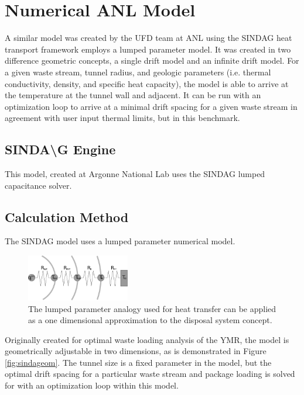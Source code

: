 \documentclass{anstrans}
\begin{document}
\section{Numerical ANL Model}

A similar model was created by the UFD team at \gls{ANL} using the \gls{SINDAG} 
heat transport framework employs a lumped parameter model. It was created in two  
difference geometric concepts, a single drift model and an infinite drift model.  
For a given waste stream, tunnel radius, and geologic parameters (i.e.  thermal 
conductivity, density, and specific heat capacity), the model is able to arrive  
at the temperature at the tunnel wall and adjacent. It can be run with an 
optimization loop to arrive at a minimal drift spacing for a given waste stream 
in agreement with user input thermal limits, but in this benchmark. 

\subsection{SINDA{\textbackslash}G Engine}

This model, created at Argonne National Lab  uses the \gls{SINDAG} lumped 
capacitance solver.  

\subsection{Calculation Method}

The \gls{SINDAG} model uses a lumped parameter numerical model.

\begin{figure}[h!]
  \begin{center}
    \includegraphics[width=0.4\textwidth]{lumpedParam.eps}
  \end{center}
  \caption{The lumped parameter analogy used for heat transfer can be applied as 
  a one dimensional approximation to the disposal system concept. }
  \label{fig:lumpedParam}
\end{figure}

Originally created for optimal waste loading analysis of the \gls{YMR}, the 
model is geometrically adjustable in two dimensions,  as is demonstrated in 
Figure \ref{fig:sindageom}. The tunnel size is a fixed parameter in the model, 
but the optimal drift spacing for a particular waste stream and package loading 
is solved for with an optimization loop within this model.
\end{document}
